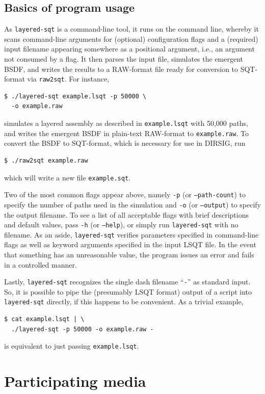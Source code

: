 \documentclass[
    twoside,
    twocolumn,
    letterpaper,
    10pt]{article}
\begin{document}
\subsection{Basics of program usage}

As \texttt{layered-sqt} is a command-line tool, it runs
on the command line, whereby it scans command-line arguments for
(optional) configuration flags and a (required) input filename
appearing somewhere as a positional argument, i.e., an argument 
not consumed by a flag. It then parses the input file, simulates 
the emergent BSDF,
and writes the results to a RAW-format file ready for conversion to
SQT-format via \texttt{raw2sqt}. For instance, 
\begin{verbatim}
$ ./layered-sqt example.lsqt -p 50000 \
  -o example.raw
\end{verbatim}
simulates a layered assembly as described in \texttt{example.lsqt} 
with 50,000 paths, and writes the emergent BSDF in plain-text RAW-format to
\texttt{example.raw}. To convert the BSDF to SQT-format, which is necessary
for use in DIRSIG, run
\begin{verbatim}
$ ./raw2sqt example.raw
\end{verbatim}
which will write a new file \texttt{example.sqt}.

Two of the most common flags appear above, namely
\texttt{-p} (or \texttt{--path-count}) to specify the number of paths used in
the simulation and \texttt{-o} (or \texttt{--output}) to specify the output 
filename. To see a list of all acceptable flags with brief descriptions and 
default values, pass \texttt{-h} (or \texttt{--help}), or simply run 
\texttt{layered-sqt} with no filename. As an aside,
\texttt{layered-sqt} verifies parameters specified in command-line flags
as well as keyword arguments specified in the input LSQT file.
In the event that something has an unreasonable value, the program
issues an error and fails in a controlled manner.

Lastly, \texttt{layered-sqt} recognizes the single dash filename 
``\texttt{-}'' as standard input. So, it is possible to pipe the 
(presumably LSQT format) output of a script into \texttt{layered-sqt} 
directly, if this happens to be convenient. As a trivial example,
\begin{verbatim}
$ cat example.lsqt | \
  ./layered-sqt -p 50000 -o example.raw -
\end{verbatim}
is equivalent to just passing \texttt{example.lsqt}.

\section{Participating media}
\end{document}
